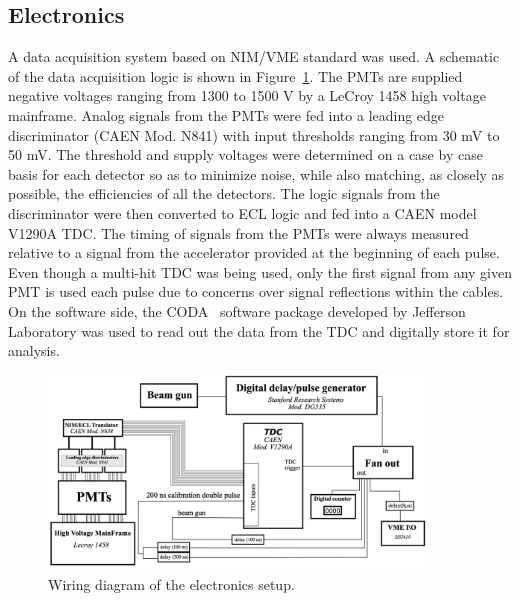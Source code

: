 \subsection{Electronics}
A data acquisition system based on NIM/VME standard was used.
A schematic of the data acquisition logic is shown in Figure~\ref{fig:WiringDiagram}.
The PMTs are supplied negative voltages ranging from 1300 to 1500 V by a LeCroy 1458 high voltage mainframe.
Analog signals from the PMTs were fed into a leading edge discriminator (CAEN Mod. N841) with input thresholds ranging from 30 mV to 50 mV.
The threshold and supply voltages were determined on a case by case basis for each detector so as to minimize noise, while also matching, as closely as possible, the efficiencies of all the detectors.
The logic signals from the discriminator were then converted to ECL logic and fed into a CAEN model V1290A TDC.
The timing of signals from the PMTs were always measured relative to a signal from the accelerator provided at the beginning of each pulse.
Even though a multi-hit TDC was being used, only the first signal from any given PMT is used each pulse due to concerns over signal reflections within the cables.
On the software side, the CODA~\cite{CODA} software package developed by Jefferson Laboratory was used to read out the data from the TDC and digitally store it for analysis.

\begin{figure}[h]
\includegraphics[width=0.9\textwidth]{Content/Methods/WiringDiagram.png}
\caption{Wiring diagram of the electronics setup. }
\label{fig:WiringDiagram}
\end{figure}
